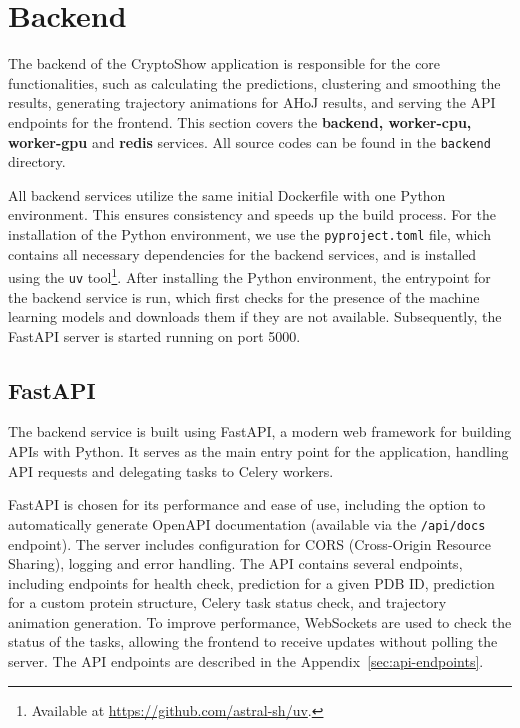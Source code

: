 \section{Backend}
\label{sec:backend}

The backend of the CryptoShow application is responsible for the core functionalities, such as calculating the predictions, clustering and smoothing the results, generating trajectory animations for AHoJ results, and serving the API endpoints for the frontend. This section covers the \textbf{backend, worker-cpu, worker-gpu} and \textbf{redis} services. All source codes can be found in the \lstinline|backend| directory.

All backend services utilize the same initial Dockerfile with one Python environment. This ensures consistency and speeds up the build process. For the installation of the Python environment, we use the \lstinline|pyproject.toml| file, which contains all necessary dependencies for the backend services, and is installed using the \lstinline|uv| tool\footnote{Available at \url{https://github.com/astral-sh/uv}.}. After installing the Python environment, the entrypoint for the backend service is run, which first checks for the presence of the machine learning models and downloads them if they are not available. Subsequently, the FastAPI server is started running on port 5000.

\subsection{FastAPI}
\label{sec:fastapi}

The backend service is built using FastAPI, a modern web framework for building APIs with Python. It serves as the main entry point for the application, handling API requests and delegating tasks to Celery workers.

FastAPI is chosen for its performance and ease of use, including the option to automatically generate OpenAPI documentation (available via the \lstinline|/api/docs| endpoint). The server includes configuration for CORS (Cross-Origin Resource Sharing), logging and error handling. The API contains several endpoints, including endpoints for health check, prediction for a given PDB ID, prediction for a custom protein structure, Celery task status check, and trajectory animation generation. To improve performance, WebSockets are used to check the status of the tasks, allowing the frontend to receive updates without polling the server. The API endpoints are described in the Appendix~\ref{sec:api-endpoints}.

